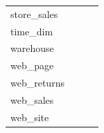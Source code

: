 \documentclass[conference]{IEEEtran}
\begin{document}
\begin{table}[htbp]
\begin{center}
\begin{tabular}{|l|c|c|c|}
			store\_sales            & \checkmark          &                    &                \\
			time\_dim               & \checkmark          &                    &                \\
			warehouse               & \checkmark          &                    &                \\
			web\_page               &                     &                    & \checkmark     \\
			web\_returns            &                     &                    & \checkmark     \\
			web\_sales              & \checkmark          &                    &                \\
			web\_site               &                     &                    & \checkmark     \\
			\hline
		\end{tabular}
		\label{table:data-distribution-2}
	\end{center}
\end{table}
\end{document}
